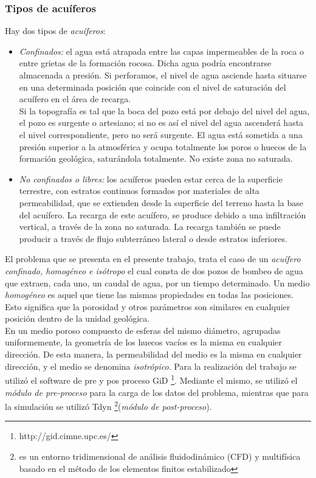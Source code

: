 \documentclass[10pt,a4paper,final]{article}
\begin{document}
\subsubsection*{Tipos de acuíferos}
Hay dos tipos de \emph{acuíferos}: 
\begin{itemize}
\item \emph{Confinados: }el agua está atrapada entre las capas impermeables de la roca o entre grietas de la formación rocosa. Dicha agua podría encontrarse almacenada a presión. Si perforamos, el nivel de agua asciende hasta situarse en una determinada posición que coincide con el nivel de saturación del acuífero en el área de recarga.\\
Si la topografía es tal que la boca del pozo está por debajo del nivel del agua, el pozo es
surgente o artesiano; si no es así el nivel del agua ascenderá hasta el nivel correspondiente, pero no será surgente. El agua está sometida a una presión superior a la atmosférica y ocupa totalmente los poros o huecos de la formación geológica, saturándola totalmente. No existe zona no saturada. \\
%
\item \emph{No confinados o libres: } los acuíferos pueden estar cerca de la superficie terrestre, con estratos continuos formados por materiales de alta permeabilidad, que se extienden desde la superficie del terreno hasta la base del acuífero. La recarga de este acuífero, se produce debido a una infiltración vertical, a través de la zona no saturada. La recarga también se puede producir a través de flujo subterráneo lateral o desde estratos inferiores.\\
\end{itemize}
%
El problema que se presenta en el presente trabajo, trata el caso de un \emph{acuífero confinado, homogéneo e isótropo} el cual consta de dos pozos de bombeo de agua que extraen, cada uno, un caudal de agua, por un tiempo determinado.
Un medio \emph{homogéneo} es aquel que tiene las mismas propiedades en todas las posiciones. Esto significa que la porosidad y otros parámetros son similares en cualquier posición dentro de la unidad geológica.\\
En un medio poroso compuesto de esferas del mismo diámetro, agrupadas uniformemente, la geometría de los huecos vacíos es la misma en cualquier dirección. De esta manera, la permeabilidad del medio es la misma en cualquier dirección, y el medio se denomina \emph{isotrópico}.
Para la realización del trabajo se utilizó el software de pre y pos proceso GiD \footnote{http://gid.cimne.upc.es/}. Mediante el mismo, se utilizó el \emph{módulo de pre-proceso} para la carga de los datos del problema, mientras que para la simulación se utilizó Tdyn \footnote{es un entorno tridimensional de análisis fluidodinámico (CFD) y multifísica basado en el método de los elementos finitos estabilizado}(\emph{módulo de post-proceso}).
\end{document}
